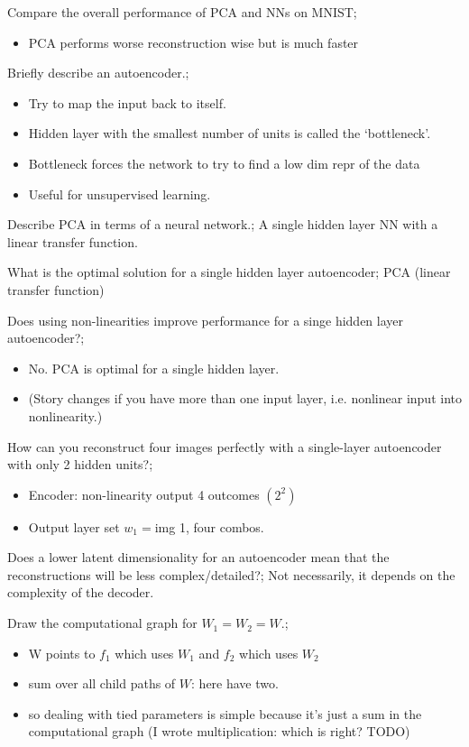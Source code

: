 \documentclass{article}
\begin{document}
Compare the overall performance of PCA and NNs on MNIST; \begin{itemize}
    \item PCA performs worse reconstruction wise but is much faster
\end{itemize}

Briefly describe an autoencoder.; \begin{itemize}
    \item Try to map the input back to itself.
    \item Hidden layer with the smallest number of units is called the `bottleneck'.
    \item Bottleneck forces the network to try to find a low dim repr of the data
    \item Useful for unsupervised learning.
\end{itemize}

Describe PCA in terms of a neural network.; A single hidden layer NN with a linear transfer function.

What is the optimal solution for a single hidden layer autoencoder; PCA (linear transfer function)

Does using non-linearities improve performance for a singe hidden layer autoencoder?; \begin{itemize}
    \item No. PCA is optimal for a single hidden layer. 
    \item (Story changes if you have more than one input layer, i.e. nonlinear input into nonlinearity.)
\end{itemize}

How can you reconstruct four images perfectly with a single-layer autoencoder with only 2 hidden units?; \begin{itemize}
    \item Encoder: non-linearity output 4 outcomes $(2^2)$
    \item Output layer set $w_1=$img 1, four combos.
\end{itemize}

Does a lower latent dimensionality for an autoencoder mean that the reconstructions will be less complex/detailed?; Not necessarily, it depends on the complexity of the decoder.

Draw the computational graph for $W_1 = W_2 = W$.; \begin{itemize}
    \item W points to $f_1$ which uses $W_1$ and $f_2$ which uses $W_2$
    \item sum over all child paths of $W$: here have two.
    \item so dealing with tied parameters is simple because it's just a sum in the computational graph (I wrote multiplication: which is right? TODO)
\end{itemize}

\end{document}
